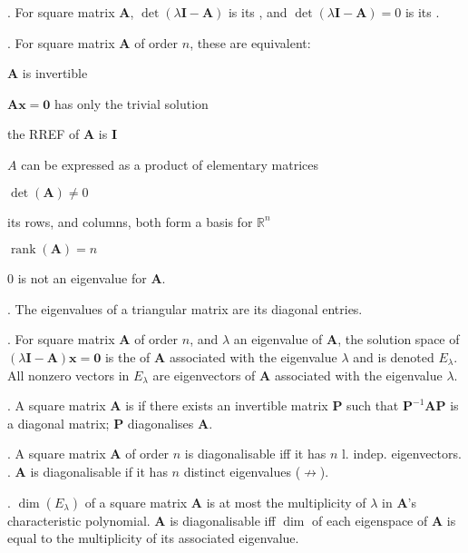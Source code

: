 \documentclass{slnotes}
\DeclareMathOperator*{\rank}{rank}
\begin{document}
. For square matrix \(\mathbf A\), \(\det(\lambda\mathbf I - \mathbf A)\) is its , and \(\det(\lambda\mathbf I - \mathbf A) = 0\) is its .

. For square matrix \(\mathbf A\) of order \(n\), these are equivalent:
\begin{slinenum}
\item \(\mathbf A\) is invertible
\item \(\mathbf{Ax} = \mathbf{0}\) has only the trivial solution
\item the RREF of \(\mathbf A\) is \(\mathbf I\)
\item \(A\) can be expressed as a product of elementary matrices
\item \(\det(\mathbf A) \ne 0\)
\item its rows, and columns, both form a basis for \(\mathbb{R}^n\)
\item \(\rank(\mathbf A) = n\)
\item \(0\) is not an eigenvalue for \(\mathbf A\).
\end{slinenum}

. The eigenvalues of a triangular matrix are its diagonal entries.

. For square matrix \(\mathbf A\) of order \(n\), and \(\lambda\) an eigenvalue of \(\mathbf A\), the solution space of \((\lambda\mathbf I - \mathbf A)\mathbf x = \mathbf 0\) is the  of \(\mathbf A\) associated with the eigenvalue \(\lambda\) and is denoted \(E_\lambda\). All nonzero vectors in \(E_\lambda\) are eigenvectors of \(\mathbf A\) associated with the eigenvalue \(\lambda\).

. A square matrix \(\mathbf A\) is  if there exists an invertible matrix \(\mathbf P\) such that \(\mathbf P^{-1}\mathbf{AP}\) is a diagonal matrix; \(\mathbf P\) diagonalises \(\mathbf A\).

. A square matrix \(\mathbf A\) of order \(n\) is diagonalisable iff it has \(n\) l. indep. eigenvectors. . \(\mathbf A\) is diagonalisable if it has \(n\) distinct eigenvalues (\(\not\to\)).

. \(\dim(E_\lambda)\) of a square matrix \(\mathbf A\) is at most the multiplicity of \(\lambda\) in \(\mathbf{A}\)'s characteristic polynomial. \(\mathbf A\) is diagonalisable iff \(\dim\) of each eigenspace of \(\mathbf A\) is equal to the multiplicity of its associated eigenvalue.
\end{document}
